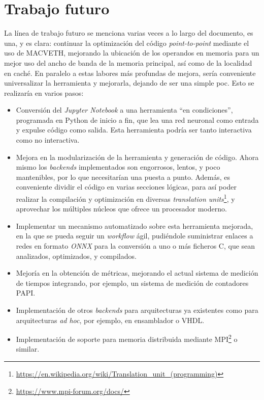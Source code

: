 \section{Trabajo futuro}
La línea de trabajo futuro se menciona varias veces a lo largo del documento, es una, y es clara: continuar la optimización del código \textit{point-to-point} mediante el uso de MACVETH, mejorando la ubicación de los operandos en memoria para un mejor uso del ancho de banda de la memoria principal, así como de la localidad en caché. En paralelo a estas labores más profundas de mejora, sería conveniente universalizar la herramienta y mejorarla, dejando de ser una simple \acrshort{poc}. Esto se realizaría en varios pasos: 
\begin{itemize}
    \item Conversión del \textit{Jupyter Notebook} a una herramienta ``en condiciones'', programada en Python de inicio a fin, que lea una red neuronal como entrada y expulse código como salida. Esta herramienta podría ser tanto interactiva como no interactiva.
    \item Mejora en la modularización de la herramienta y generación de código. Ahora mismo los \textit{\gls{backend}s} implementados son engorrosos, lentos, y poco mantenibles, por lo que necesitarían una puesta a punto. Además, es conveniente dividir el código en varias secciones lógicas, para así poder realizar la compilación y optimización en diversas \textit{translation units}\footnote{\url{https://en.wikipedia.org/wiki/Translation_unit_(programming)}}, y aprovechar los múltiples núcleos que ofrece un procesador moderno.
    \item Implementar un mecanismo automatizado sobre esta herramienta mejorada, en la que se pueda seguir un \textit{workflow} ágil, pudiéndole suministrar enlaces a redes en formato \textit{ONNX} para la conversión a uno o más ficheros C, que sean analizados, optimizados, y compilados.
    \item Mejoría en la obtención de métricas, mejorando el actual sistema de medición de tiempos integrando, por ejemplo, un sistema de medición de contadores PAPI.
    \item Implementación de otros \textit{\gls{backend}s} para arquitecturas ya existentes como para arquitecturas \textit{ad hoc}, por ejemplo, en ensamblador o VHDL.
    \item Implementación de soporte para memoria distribuida mediante MPI\footnote{\url{https://www.mpi-forum.org/docs/}} o similar.
\end{itemize}
